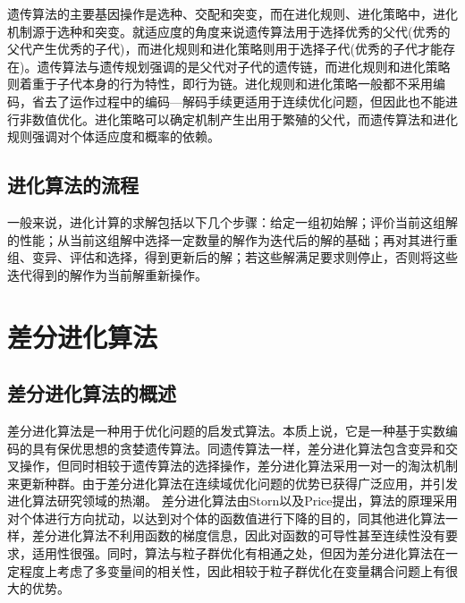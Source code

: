 \documentclass[12pt]{article}
\begin{document}
遗传算法的主要基因操作是选种、交配和突变，而在进化规则、进化策略中，进化机制源于选种和突变。就适应度的角度来说遗传算法用于选择优秀的父代(优秀的父代产生优秀的子代)，而进化规则和进化策略则用于选择子代(优秀的子代才能存在)。遗传算法与遗传规划强调的是父代对子代的遗传链，而进化规则和进化策略则着重于子代本身的行为特性，即行为链。进化规则和进化策略一般都不采用编码，省去了运作过程中的编码—解码手续更适用于连续优化问题，但因此也不能进行非数值优化。进化策略可以确定机制产生出用于繁殖的父代，而遗传算法和进化规则强调对个体适应度和概率的依赖。

\subsection{进化算法的流程}
一般来说，进化计算的求解包括以下几个步骤：给定一组初始解；评价当前这组解的性能；从当前这组解中选择一定数量的解作为迭代后的解的基础；再对其进行重组、变异、评估和选择，得到更新后的解；若这些解满足要求则停止，否则将这些迭代得到的解作为当前解重新操作。

\section{差分进化算法}
\subsection{差分进化算法的概述}
差分进化算法是一种用于优化问题的启发式算法。本质上说，它是一种基于实数编码的具有保优思想的贪婪遗传算法。同遗传算法一样，差分进化算法包含变异和交叉操作，但同时相较于遗传算法的选择操作，差分进化算法采用一对一的淘汰机制来更新种群。由于差分进化算法在连续域优化问题的优势已获得广泛应用，并引发进化算法研究领域的热潮。 差分进化算法由Storn以及Price提出，算法的原理采用对个体进行方向扰动，以达到对个体的函数值进行下降的目的，同其他进化算法一样，差分进化算法不利用函数的梯度信息，因此对函数的可导性甚至连续性没有要求，适用性很强。同时，算法与粒子群优化有相通之处，但因为差分进化算法在一定程度上考虑了多变量间的相关性，因此相较于粒子群优化在变量耦合问题上有很大的优势。
\end{document}
